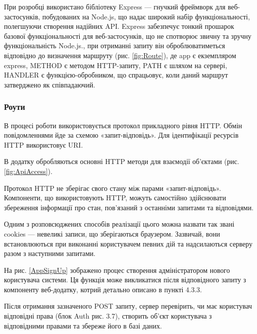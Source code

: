 При розробці використано бібліотеку Express — гнучкий фреймворк для веб-застосунків, побудованих на Node.js, що надає широкий набір функціональності, полегшуючи створення надійних API.
Express забезпечує тонкий прошарок базової функціональності для веб-застосунків, що не спотворює звичну та зручну функціональність Node.js., при отриманні запиту він оброблюватиметься відповідно до визначення маршруту (рис. \ref{fig:Route}), де app є екземпляром express, METHOD є методом HTTP-запиту, PATH є шляхом на сервері, HANDLER є функцією-обробником, що спрацьовує, коли даний маршрут затверджено як співпадаючий.


\subsubsection{Роути}

В процесі роботи використовується протокол прикладного рівня HTTP. Обмін повідомленнями йде за схемою «запит-відповідь». Для ідентифікації ресурсів HTTP використовує URI. 

В додатку обробляються основні  HTTP методи для взаємодії об’єктами (рис. \ref{fig:ApiAccess}). 


Протокол HTTP не зберігає свого стану між парами «запит-відповідь». Компоненти, що використовують HTTP, можуть самостійно здійснювати збереження інформації про стан, пов'язаний з останніми запитами та відповідями. 

Одним з розповсюджених способів реалізації цього можна назвати так звані cookies — невеликі записи, що зберігаються браузером. Зазвичай, вони встановлюються при виконанні користувачем певних дій та надсилаються серверу разом з наступними запитами. 

На рис. \ref{AppSignUp} зображено процес створення адміністратором нового користувача системи. Ця функція може викликатися після відповідного запиту з компоненту веб-додатку, котрий детально описано в пункті 4.3.3.


Після отримання зазначеного POST запиту, сервер перевірить, чи має користувач відповідні права (блок Auth рис. 3.7), створить об’єкт користувача з відповідними правами та збереже його в базі даних.

